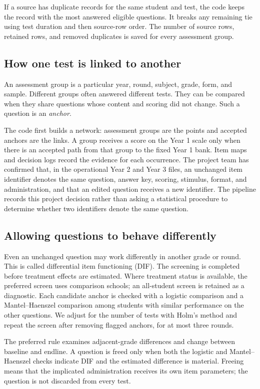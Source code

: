 If a source has duplicate records for the same student and test, the code keeps
the record with the most answered eligible questions. It breaks any remaining
tie using test duration and then source-row order. The number of source rows,
retained rows, and removed duplicates is saved for every assessment group.

\subsection{How one test is linked to another}

An assessment group is a particular year, round, subject, grade, form, and
sample. Different groups often answered different tests. They can be compared
when they share questions whose content and scoring did not change. Such a
question is an \emph{anchor}.

The code first builds a network: assessment groups are the points and accepted
anchors are the links. A group receives a score on the Year 1 scale only when
there is an accepted path from that group to the fixed Year 1 bank. Item maps
and decision logs record the evidence for each occurrence. The project team
has confirmed that, in the operational Year 2 and Year 3 files, an unchanged
item identifier denotes the same question, answer key, scoring, stimulus,
format, and administration, and that an edited question receives a new
identifier. The pipeline records this project decision rather than asking a
statistical procedure to determine whether two identifiers denote the same
question.

\subsection{Allowing questions to behave differently}

Even an unchanged question may work differently in another grade or round.
This is called differential item functioning (DIF). The screening is completed
before treatment effects are estimated. Where treatment status is available,
the preferred screen uses comparison schools; an all-student screen is retained
as a diagnostic. Each candidate anchor is checked with a logistic comparison
and a Mantel--Haenszel comparison among students with similar performance on
the other questions. We adjust for the number of tests with Holm's method and
repeat the screen after removing flagged anchors, for at most three rounds.

The preferred rule examines adjacent-grade differences and change between
baseline and endline. A question is freed only when both the logistic and
Mantel--Haenszel checks indicate DIF and the estimated difference is material.
Freeing means that the implicated administration receives its own item
parameters; the question is not discarded from every test.

